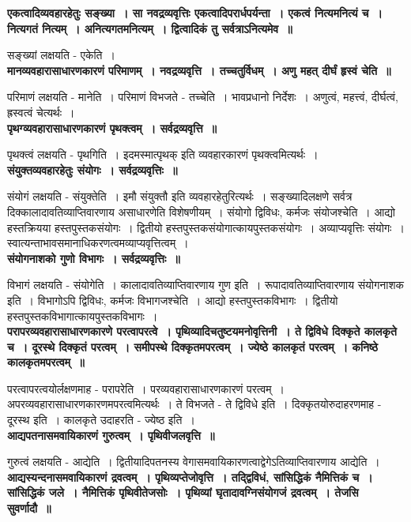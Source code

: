 	{\bfseries एकत्वादिव्यवहारहेतुः सङ्ख्या~। सा नवद्रव्यवृत्तिः एकत्वादिपरार्धपर्यन्ता~। एकत्वं नित्यमनित्यं च~। नित्यगतं नित्यम्~। अनित्यगतमनित्यम्~। द्वित्वादिकं तु सर्वत्राऽनित्यमेव~॥}\par
		सङ्ख्यां लक्षयति - एकेति~।\\[10pt]
	{\bfseries मानव्यवहारासाधारणकारणं परिमाणम्~। नवद्रव्यवृत्ति~। तच्चतुर्विधम्~। अणु महत् दीर्घं हृस्वं चेति~॥}\par
		परिमाणं लक्षयति - मानेति~। परिमाणं विभजते - तच्चेति~। भावप्रधानो निर्देशः~। अणुत्वं, महत्त्वं, दीर्घत्वं, ह्रस्वत्वं चेत्यर्थः~।\\[10pt]
	{\bfseries पृथग्व्यवहारासाधारणकारणं पृथक्त्वम्~। सर्वद्रव्यवृत्ति~॥}\par
		पृथक्त्वं लक्षयति - पृथगिति~। इदमस्मात्पृथक् इति व्यवहारकारणं पृथक्त्वमित्यर्थः~।\\[10pt]
	{\bfseries संयुक्तव्यवहारहेतुः संयोगः~। सर्वद्रव्यवृत्तिः~॥}\par
		संयोगं लक्षयति - संयुक्तेति~। इमौ संयुक्तौ इति व्यवहारहेतुरित्यर्थः~। सङ्ख्यादिलक्षणे सर्वत्र दिक्कालादावतिव्याप्तिवारणाय असाधारणेति विशेषणीयम्~। संयोगो द्विविधः, कर्मजः संयोजश्चेति~। आद्यो हस्तक्रियया हस्तपुस्तकसंयोगः~। द्वितीयो हस्तपुस्तकसंयोगात्कायपुस्तकसंयोगः~। अव्याप्यवृत्तिः संयोगः~। स्वात्यन्ताभावसमानाधिकरणत्वमव्याप्यवृत्तित्वम्~।\\[10pt]
	{\bfseries संयोगनाशको गुणो विभागः~। सर्वद्रव्यवृत्तिः~॥}\par
		विभागं लक्षयति - संयोगेति~। कालादावतिव्याप्तिवारणाय गुण इति~। रूपादावतिव्याप्तिवारणाय संयोगनाशक इति~। विभागोऽपि द्विविधः, कर्मजः विभागजश्चेति~। आद्यो हस्तपुस्तकविभागः~। द्वितीयो हस्तपुस्तकविभागात्कायपुस्तकविभागः~।\\[10pt]
	{\bfseries परापरव्यवहारासाधारणकारणे परत्वापरत्वे~। पृथिव्यादिचतुष्टयमनोवृत्तिनी~। ते द्विविधे दिक्कृते कालकृते च~। दूरस्थे दिक्कृतं परत्वम्~। समीपस्थे दिक्कृतमपरत्वम्~। ज्येष्ठे कालकृतं परत्वम्~। कनिष्ठे कालकृतमपरत्वम्~॥}\par
		परत्वापरत्वयोर्लक्षणमाह - परापरेति~। परव्यवहारासाधारणकारणं परत्वम्~। अपरव्यवहारासाधारणकारणमपरत्वमित्यर्थः~। ते विभजते - ते द्विविधे इति~। दिक्कृतयोरुदाहरणमाह - दूरस्थ इति~। कालकृते उदाहरति - ज्येष्ठ इति~।\\[10pt]
	{\bfseries आद्यपतनासमवायिकारणं गुरुत्वम्~। पृथिवीजलवृत्ति~॥}\par
		गुरुत्वं लक्षयति - आद्येति~। द्वितीयादिपतनस्य वेगासमवायिकारणत्वाद्वेगेऽतिव्याप्तिवारणाय आद्येति~।\\[10pt]
	{\bfseries आद्यस्यन्दनासमवायिकारणं द्रवत्वम्~। पृथिव्यप्तेजोवृत्ति~। तद्द्विविधं, सांसिद्धिकं नैमित्तिकं च~। सांसिद्धिकं जले~। नैमित्तिकं पृथिवीतेजसोः~। पृथिव्यां घृतादावग्निसंयोगजं द्रवत्वम्~। तेजसि सुवर्णादौ~॥}\par
